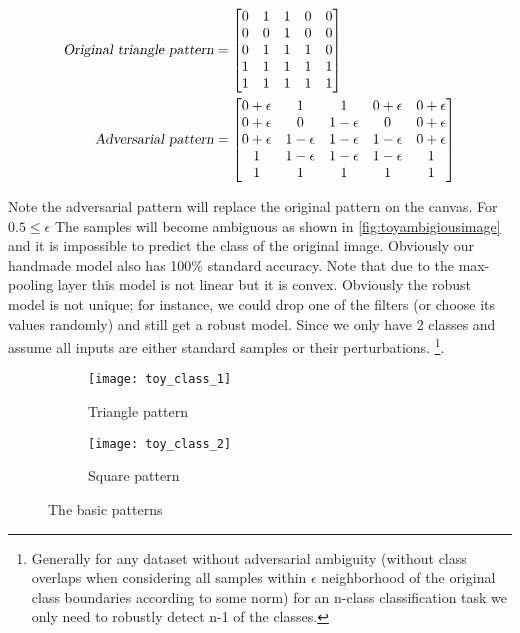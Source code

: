 \documentclass[../thesis.tex]{subfiles}
\begin{document}
	\begin{align*} 
	\variablename{Original triangle pattern}&=
	\begin{bmatrix}
		0& 1& 1& 0& 0 \\
		0& 0& 1& 0& 0 \\
		0& 1& 1& 1& 0 \\
		1& 1& 1& 1& 1 \\
		1& 1& 1& 1& 1 
	\end{bmatrix} \\
	\variablename{Adversarial pattern}&=
	\begin{bmatrix}
	0+\epsilon& 1& 1& 0+\epsilon&  0+\epsilon\\
	0+\epsilon& 0& 1-\epsilon& 0& 0+\epsilon\\
	0+\epsilon& 1-\epsilon& 1-\epsilon& 1-\epsilon& 0+\epsilon\\
	1& 1-\epsilon& 1-\epsilon& 1-\epsilon& 1\\
	1& 1& 1& 1& 1
	\end{bmatrix}
	\end{align*}
		
	Note the adversarial pattern will replace the original pattern on the canvas. For $ 0.5 \leq \epsilon $ The samples will become ambiguous as shown in \ref{fig:toyambigiousimage} and it is impossible to predict the class of the original image. Obviously our handmade model also has 100\% standard accuracy. Note that due to the max-pooling layer this model is not linear but it is convex. Obviously the robust model is not unique; for instance, we could drop one of the filters (or choose its values randomly) and still get a robust model. Since we only have 2 classes and assume all inputs are either standard samples or their perturbations. \footnote{Generally for any dataset without adversarial ambiguity (without class overlaps when considering all samples within $\epsilon$ neighborhood of the original class boundaries according to some norm) for an n-class classification task we only need to robustly detect n-1 of the classes.}.   

	\begin{figure}
		\centering
		\begin{subfigure}{.5\textwidth}
			\centering
			\texttt{[image: toy\_class\_1]}
			\caption{Triangle pattern}
			\label{fig:toyclass1}
		\end{subfigure}%
		\begin{subfigure}{.5\textwidth}
			\centering
			\texttt{[image: toy\_class\_2]}
			\caption{Square pattern}
			\label{fig:toyclass2}
		\end{subfigure}
		\caption{The basic patterns}
		\label{fig:Triangle_square_classes}
	\end{figure}
	
\end{document}
